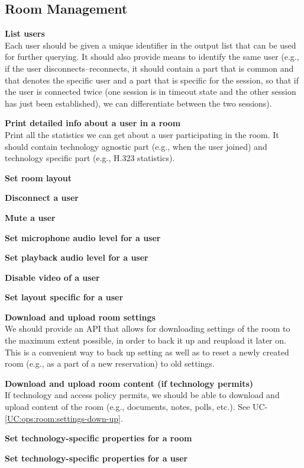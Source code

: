 \documentclass[a4paper]{report}
\makeatletter
\newcounter{UCcounter}
\newenvironment{UseCases}%
	{\begin{list}{\textbf{UC-\arabic{UCcounter}}}{\@nmbrlisttrue\def\@listctr{UCcounter}}}%
	{\end{list}}
\newcommand{\UClabel}[1]{\label{UC:#1}}
\newcommand{\UCref}[1]{UC-\ref{UC:#1}}
\newcommand{\UseCase}[2]{\item\UClabel{#2} \textbf{#1}\\}
\makeatother
\begin{document}
\subsection{Room Management}

\begin{UseCases}

\UseCase{List users}{ops:room:users-list}

Each user should be given a unique identifier in the output list that can be
used for further querying. It should also provide means to identify the same
user (e.g., if the user disconnects--reconnects, it should contain a part that
is common and that denotes the specific user and a part that is specific for
the session, so that if the user is connected twice (one session is in timeout
state and the other session has just been established), we can differentiate
between the two sessions).

\UseCase{Print detailed info about a user in a room}{ops:room:user-info}

Print all the statistics we can get about a user participating in the room. It
should contain technology agnostic part (e.g., when the user joined) and
technology specific part (e.g., H.323 statistics).

\UseCase{Set room layout}{ops:room:layout}

\UseCase{Disconnect a user}{ops:room:user-disconnect}

\UseCase{Mute a user}{ops:room:user-mute}

\UseCase{Set microphone audio level for a user}{ops:room:user-miclevel}

\UseCase{Set playback audio level for a user}{ops:room:user-playlevel}

\UseCase{Disable video of a user}{ops:room:user-video-off}

\UseCase{Set layout specific for a user}{ops:room:user-layout}

\UseCase{Download and upload room settings}{ops:room:settings-down-up}

We should provide an API that allows for downloading settings of the room to
the maximum extent possible, in order to back it up and reupload it later on.
This is a convenient way to back up setting as well as to reset a newly created
room (e.g., as a part of a new reservation) to old settings.

\UseCase{Download and upload room content (if technology
permits)}{ops:room:content-down-up}

If technology and access policy permits, we should be able to download and
upload content of the room (e.g., documents, notes, polls, etc.). See
\UCref{ops:room:settings-down-up}.

\UseCase{Set technology-specific properties for a room}{ops:room:room-techspec}

\UseCase{Set technology-specific properties for a user}{ops:room:user-techspec}

\end{UseCases}
\end{document}
